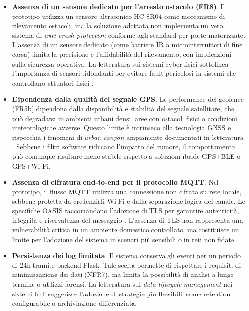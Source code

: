\begin{itemize}
    \item \textbf{Assenza di un sensore dedicato per l'arresto ostacolo (FR8)}. Il prototipo utilizza un sensore ultrasonico HC-SR04 come meccanismo di rilevamento ostacoli, ma la soluzione adottata non implementa un vero sistema di \textit{anti-crush protection} conforme agli standard per porte motorizzate. L'assenza di un sensore dedicato (come barriere IR o microinterruttori di fine corsa) limita la precisione e l'affidabilità del rilevamento, con implicazioni sulla sicurezza operativa. La letteratura sui sistemi cyber-fisici sottolinea l'importanza di sensori ridondanti per evitare fault pericolosi in sistemi che controllano attuatori fisici \cite{Lee2015, Avizienis2004}.
    
    \item \textbf{Dipendenza dalla qualità del segnale GPS}. Le performance del geofence (FR5b) dipendono dalla disponibilità e stabilità del segnale satellitare, che può degradarsi in ambienti urbani densi, aree con ostacoli fisici o condizioni meteorologiche avverse. Questo limite è intrinseco alla tecnologia GNSS e rispecchia i fenomeni di \textit{urban canyon} ampiamente documentati in letteratura \cite{Zanella2014}. Sebbene i filtri software riducano l'impatto del rumore, il comportamento può comunque risultare meno stabile rispetto a soluzioni ibride GPS+BLE o GPS+Wi-Fi.
    
    \item \textbf{Assenza di cifratura end-to-end per il protocollo MQTT}. Nel prototipo, il flusso MQTT utilizza una connessione non cifrata su rete locale, sebbene protetta da credenziali Wi-Fi e dalla separazione logica del canale. Le specifiche OASIS raccomandano l'adozione di TLS per garantire autenticità, integrità e riservatezza del messaggio \cite{MQTT5}. L'assenza di TLS non rappresenta una vulnerabilità critica in un ambiente domestico controllato, ma costituisce un limite per l'adozione del sistema in scenari più sensibili o in reti non fidate.
    
    \item \textbf{Persistenza dei log limitata}. Il sistema conserva gli eventi per un periodo di 24h tramite backend Flask. Tale scelta permette di rispettare i requisiti di minimizzazione dei dati (NFR7), ma limita la possibilità di analisi a lungo termine o utilizzi forensi. La letteratura sul \textit{data lifecycle management} nei sistemi IoT suggerisce l'adozione di strategie più flessibili, come retention configurabile o archiviazione differenziata.
\end{itemize}

